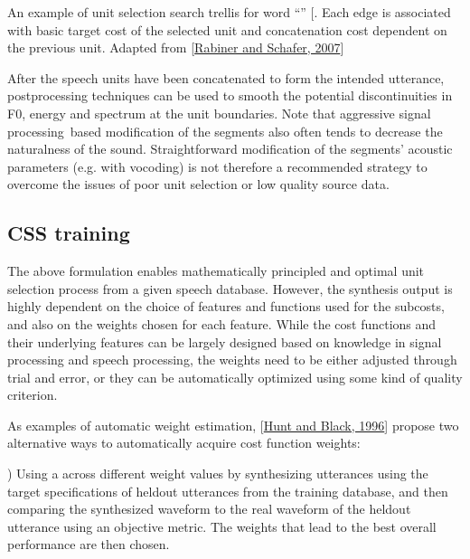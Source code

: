 \documentclass[letterpaper,10pt,english]{jupyterBook}
\begin{document}
\sphinxAtStartPar
{}

\sphinxAtStartPar
{} An example of unit selection search trellis for word
“” {[}\sphinxstyleemphasis{k ae t}{]}. Each edge is associated with basic target cost of
the selected unit and concatenation cost dependent on the previous unit.
Adapted from {[}\hyperlink{cite.Synthesis/Concatenative_speech_synthesis:id55}{Rabiner and Schafer, 2007}{]}

\sphinxAtStartPar
After the speech units have been concatenated to form the intended
utterance, postprocessing techniques can be used to smooth the potential
discontinuities in F0, energy and spectrum at the unit boundaries. Note
that aggressive signal processing based modification of the segments
also often tends to decrease the naturalness of the sound.
Straightforward modification of the segments’ acoustic parameters (e.g.
with vocoding) is not therefore a recommended strategy to overcome the
issues of poor unit selection or low quality source data.


\subsection{CSS training}
\label{\detokenize{Synthesis/Concatenative_speech_synthesis:css-training}}
\sphinxAtStartPar
The above formulation enables mathematically principled and optimal unit
selection process from a given speech database. However, the synthesis
output is highly dependent on the choice of features and functions used
for the subcosts, and also on the weights chosen for each feature. While
the cost functions and their underlying features can be largely designed
based on knowledge in signal processing and speech processing, the
weights need to be either adjusted through trial and error, or they can
be automatically optimized using some kind of quality criterion.

\sphinxAtStartPar
As examples of automatic weight estimation, {[}\hyperlink{cite.Synthesis/Concatenative_speech_synthesis:id54}{Hunt and Black, 1996}{]} propose
two alternative ways to automatically acquire cost function weights:

) Using a 
across different weight values by synthesizing utterances using the
target specifications of held\sphinxhyphen{}out utterances from the training database,
and then comparing the synthesized waveform to the real waveform of the
held\sphinxhyphen{}out utterance using an objective metric. The weights that lead to
the best overall performance are then chosen.
\end{document}
